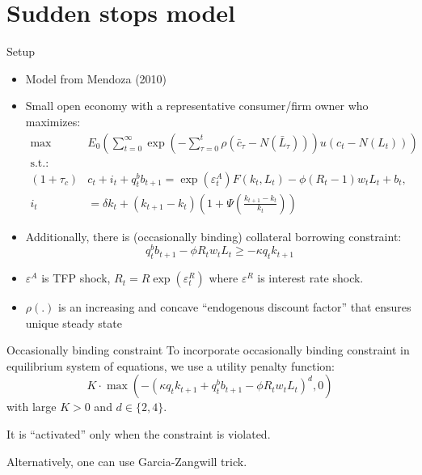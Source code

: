 \documentclass{beamer}
\begin{document}
\section{Sudden stops model}


\begin{frame}{Setup}
    \small
    \begin{itemize}
        \item Model from Mendoza (2010) 
        \item Small open economy with a representative consumer/firm owner who maximizes:
            \footnotesize
            \begin{align*}
                \max & E_0 \left( \sum_{t=0}^{\infty} \exp \left( - \sum_{\tau=0}^{t} \rho \left(
                            \bar{c}_{\tau} -
                N(\bar{L}_{\tau}) \right) \right) u\left(c_t - N(L_t)\right) \right) \\
                \text{s.t.:} & \\ 
                (1+\tau_c) & c_t + i_t + q_t^b b_{t+1} = \exp(\varepsilon^A_t) F(k_t, L_t) - \phi(R_t-1) w_t L_t + b_t, \\
                i_t & = \delta k_t + (k_{t+1} - k_t) \left(1 + \Psi\left(\frac{k_{t+1}-k_t}{k_t}\right) \right)
            \end{align*}
        \item Additionally, there is (occasionally binding) collateral borrowing constraint:
            \[
                q^b_t b_{t+1} - \phi R_t w_t L_t \geq -\kappa q_t k_{t+1}
            \]
        \item $\varepsilon^A$ is TFP shock, $R_t = R \exp(\varepsilon^R_t)$ where $\varepsilon^R$ is interest rate shock.
        \item $\rho(.)$ is an increasing and concave ``endogenous discount factor'' that ensures unique steady state
    \end{itemize}
    
\end{frame}

\begin{frame}{Occasionally binding constraint}
    To incorporate occasionally binding constraint in equilibrium system of equations, we 
    use a utility penalty function:
    \[
        K \cdot \max\left( -(\kappa q_t k_{t+1} + q^b_t b_{t+1} - \phi R_t w_t L_t)^d , 0\right)
    \]
    with large $K > 0$ and $d \in \{2,4\}$.

    It is ``activated'' only when the constraint is violated.

    \bigskip
    \bigskip
    \bigskip
    Alternatively, one can use Garcia-Zangwill trick.
\end{frame}
\end{document}

